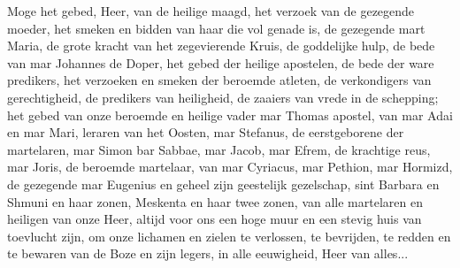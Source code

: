 \documentclass[12pt,twoside,a5paper]{article}
\begin{document}
\begin{halfparskip}
   Moge het gebed, Heer, van de heilige maagd, het verzoek van de gezegende moeder, het smeken en bidden van haar die vol genade is, de gezegende mart Maria, de grote kracht van het zegevierende Kruis, de goddelijke hulp, de bede van mar Johannes de Doper, het gebed der heilige apostelen, de bede der ware predikers, het verzoeken en smeken der beroemde atleten, de verkondigers van gerechtigheid, de predikers van heiligheid, de zaaiers van vrede in de schepping; het gebed van onze beroemde en heilige vader mar Thomas apostel, van mar Adai en mar Mari, leraren van het Oosten, mar Stefanus, de eerstgeborene der martelaren, mar Simon bar Sabbae, mar Jacob, mar Efrem, de krachtige reus, mar Joris, de beroemde martelaar, van mar Cyriacus, mar Pethion, mar Hormizd, de gezegende mar Eugenius en geheel zijn geestelijk gezelschap, sint Barbara en Shmuni en haar zonen, Meskenta en haar twee zonen, van alle martelaren en heiligen van onze Heer, altijd voor ons een hoge muur en een stevig huis van toevlucht zijn, om onze lichamen en zielen te verlossen, te bevrijden, te redden en te bewaren van de Boze en zijn legers, in alle eeuwigheid, Heer van alles...

\end{halfparskip}


\end{document}

